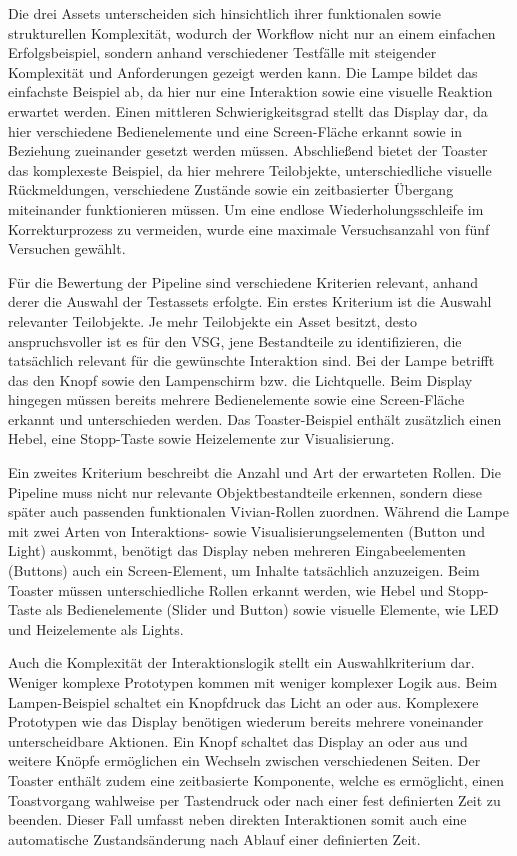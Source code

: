 Die drei Assets unterscheiden sich hinsichtlich ihrer funktionalen sowie strukturellen Komplexität, wodurch der Workflow nicht nur an einem einfachen Erfolgsbeispiel, sondern anhand verschiedener Testfälle mit steigender Komplexität und Anforderungen gezeigt werden kann. Die Lampe bildet das einfachste Beispiel ab, da hier nur eine Interaktion sowie eine visuelle Reaktion erwartet werden. Einen mittleren Schwierigkeitsgrad stellt das Display dar, da hier verschiedene Bedienelemente und eine Screen-Fläche erkannt sowie in Beziehung zueinander gesetzt werden müssen. Abschließend bietet der Toaster das komplexeste Beispiel, da hier mehrere Teilobjekte, unterschiedliche visuelle Rückmeldungen, verschiedene Zustände sowie ein zeitbasierter Übergang miteinander funktionieren müssen. Um eine endlose Wiederholungsschleife im Korrekturprozess zu vermeiden, wurde eine maximale Versuchsanzahl von fünf Versuchen gewählt.

Für die Bewertung der Pipeline sind verschiedene Kriterien relevant, anhand derer die Auswahl der Testassets erfolgte. Ein erstes Kriterium ist die Auswahl relevanter Teilobjekte. Je mehr Teilobjekte ein Asset besitzt, desto anspruchsvoller ist es für den VSG, jene Bestandteile zu identifizieren, die tatsächlich relevant für die gewünschte Interaktion sind. Bei der Lampe betrifft das den Knopf sowie den Lampenschirm bzw. die Lichtquelle. Beim Display hingegen müssen bereits mehrere Bedienelemente sowie eine Screen-Fläche erkannt und unterschieden werden. Das Toaster-Beispiel enthält zusätzlich einen Hebel, eine Stopp-Taste sowie Heizelemente zur Visualisierung.

Ein zweites Kriterium beschreibt die Anzahl und Art der erwarteten Rollen. Die Pipeline muss nicht nur relevante Objektbestandteile erkennen, sondern diese später auch passenden funktionalen Vivian-Rollen zuordnen. Während die Lampe mit zwei Arten von Interaktions- sowie Visualisierungselementen (Button und Light) auskommt, benötigt das Display neben mehreren Eingabeelementen (Buttons) auch ein Screen-Element, um Inhalte tatsächlich anzuzeigen. Beim Toaster müssen unterschiedliche Rollen erkannt werden, wie Hebel und Stopp-Taste als Bedienelemente (Slider und Button) sowie visuelle Elemente, wie LED und Heizelemente als Lights.

Auch die Komplexität der Interaktionslogik stellt ein Auswahlkriterium dar. Weniger komplexe Prototypen kommen mit weniger komplexer Logik aus. Beim Lampen-Beispiel schaltet ein Knopfdruck das Licht an oder aus. Komplexere Prototypen wie das Display benötigen wiederum bereits mehrere voneinander unterscheidbare Aktionen. Ein Knopf schaltet das Display an oder aus und weitere Knöpfe ermöglichen ein Wechseln zwischen verschiedenen Seiten. Der Toaster enthält zudem eine zeitbasierte Komponente, welche es ermöglicht, einen Toastvorgang wahlweise per Tastendruck oder nach einer fest definierten Zeit zu beenden. Dieser Fall umfasst neben direkten Interaktionen somit auch eine automatische Zustandsänderung nach Ablauf einer definierten Zeit.

